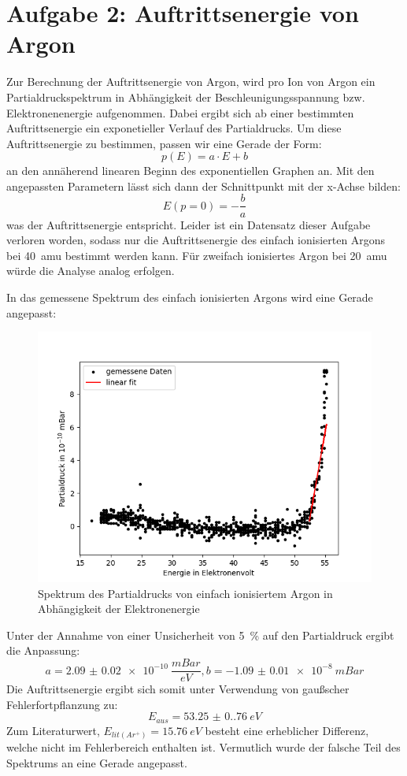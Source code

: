 \section{Aufgabe 2: Auftrittsenergie von Argon}

Zur Berechnung der Auftrittsenergie von Argon, wird pro Ion von Argon ein Partialdruckspektrum in Abhängigkeit der Beschleunigungsspannung bzw. Elektronenenergie aufgenommen. Dabei ergibt sich ab einer bestimmten Auftrittsenergie ein exponetieller Verlauf des Partialdrucks. Um diese Auftrittsenergie zu bestimmen, passen wir eine Gerade der Form: $$p(E) = a\cdot E + b$$ an den annäherend linearen Beginn des exponentiellen Graphen an. Mit den angepassten Parametern lässt sich dann der Schnittpunkt mit der x-Achse bilden: $$E(p=0) = -\frac{b}{a}$$ was der Auftrittsenergie entspricht. Leider ist ein Datensatz dieser Aufgabe verloren worden, sodass nur die Auftrittsenergie des einfach ionisierten Argons bei \SI{40}{amu} bestimmt werden kann. Für zweifach ionisiertes Argon bei \SI{20}{amu} würde die Analyse analog erfolgen. 

In das gemessene Spektrum des einfach ionisierten Argons wird eine Gerade angepasst: 
\begin{figure}[H]
    \centering
    \includegraphics[width=140mm,scale=0.8]{Massenspektrometer/include/MSArgon1Ion.png}
    \caption{Spektrum des Partialdrucks von einfach ionisiertem Argon in Abhängigkeit der Elektronenergie}
    \label{fig:MSArgon1Ion}
\end{figure}
Unter der Annahme von einer Unsicherheit von \SI{5}{\%} auf den Partialdruck ergibt die Anpassung:
$$a = \SI{2.09(2)e-10}{\frac{mBar}{eV}}, b= \SI{-1.09(1)e-8}{mBar}$$
Die Auftrittsenergie ergibt sich somit unter Verwendung von gaußscher Fehlerfortpflanzung zu:
$$E_{aus} = \SI{53.25(0.76)}{eV}$$
Zum Literaturwert, $E_{lit(Ar^+)}= \SI{15.76}{eV}$\cite{VorbereitungsMappe} besteht eine erheblicher Differenz, welche nicht im Fehlerbereich enthalten ist. Vermutlich wurde der falsche Teil des Spektrums an eine Gerade angepasst.   

